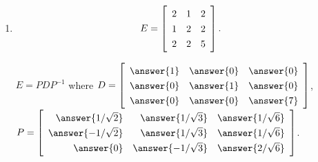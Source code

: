 \documentclass{ximera}
\begin{document}
\begin{problem}
\begin{enumerate}
    
    \item $$E = \startmat{rrr}
      2 & 1 & 2 \\
      1 & 2 & 2 \\
      2 & 2 & 5 \\
    \stopmat.$$

    $E=PDP^{-1}$ where
      $D=\startmat{rrr}
        \answer{1} & \answer{0} & \answer{0} \\
        \answer{0} & \answer{1} & \answer{0} \\
        \answer{0} & \answer{0} & \answer{7} \\
      \stopmat$,
      $\def\arraystretch{1.3}
      P=\startmat{rrr}
        \answer{1/\sqrt{2}} & \answer{1/\sqrt{3}} & \answer{1/\sqrt{6}} \\
        \answer{-1/\sqrt{2}} & \answer{1/\sqrt{3}} & \answer{1/\sqrt{6}} \\
        \answer{0} & \answer{-1/\sqrt{3}} & \answer{2/\sqrt{6}} \\
      \stopmat$.
  \end{enumerate}




\end{problem}
\end{document}
